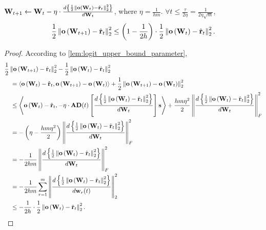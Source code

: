 \begin{lem}
		\label{lem:logit_l2_loss_parameter_smoothness}
		${\mathbf{W}}_{t+1} \leftarrow {\mathbf{W}}_t - \eta \cdot \frac{d \left\{ \frac{1}{2} \left\| {\mathbf{o}}\left( {\mathbf{W}}_t\right) - \hat{{\mathbf{r}}}_t \right\|_2^2 \right\}}{d {\mathbf{W}}_t}$, where $\eta = \frac{1}{h m}$. $\forall t \le \frac{\tau}{2 \eta} = \frac{1}{2 \eta \sqrt{m}}$,
		\begin{equation*}
		\begin{split}
		\frac{1}{2} \left\| {\mathbf{o}}\left( {\mathbf{W}}_{t+1} \right) - \hat{{\mathbf{r}}}_t \right\|_2^2 \le \left( 1 - \frac{1}{2 h} \right) \cdot \frac{1}{2} \left\| {\mathbf{o}}\left( {\mathbf{W}}_t \right) - \hat{{\mathbf{r}}}_t \right\|_2^2.
		\end{split}
		\end{equation*}
	\end{lem}
\begin{proof}
According to \cref{lem:logit_upper_bound_parameter},
\begin{equation*}
\begin{split}
    &\frac{1}{2} \left\| {\mathbf{o}}\left( {\mathbf{W}}_{t+1} \right) - \hat{{\mathbf{r}}}_t \right\|_2^2 - \frac{1}{2} \left\| {\mathbf{o}}\left( {\mathbf{W}}_t \right) - \hat{{\mathbf{r}}}_t \right\|_2^2 \\
    &\quad = \left\langle {\mathbf{o}}\left( {\mathbf{W}}_t \right) - \hat{{\mathbf{r}}}_t, {\mathbf{o}}\left( {\mathbf{W}}_{t+1} \right) - {\mathbf{o}}\left( {\mathbf{W}}_t \right) \right\rangle + \frac{1}{2} \left\| {\mathbf{o}}\left( {\mathbf{W}}_{t+1} \right) - {\mathbf{o}}\left( {\mathbf{W}}_t \right) \right\|_2^2 \\
    &\quad \le \left\langle {\mathbf{o}}\left( {\mathbf{W}}_t \right) - \hat{{\mathbf{r}}}_t, - \eta \cdot {\mathbf{A}} {\mathbf{D}}(t) \left[ \frac{d \left\{ \frac{1}{2} \left\| {\mathbf{o}}\left( {\mathbf{W}}_t\right) - \hat{{\mathbf{r}}}_t \right\|_2^2 \right\}}{d {\mathbf{W}}_t} \right] {\mathbf{s}} \right\rangle + \frac{h m \eta^2}{2} \left\| \frac{d \left\{ \frac{1}{2} \left\| {\mathbf{o}}\left( {\mathbf{W}}_t\right) - \hat{{\mathbf{r}}}_t \right\|_2^2 \right\}}{d {\mathbf{W}}_t}  \right\|_F^2 \\
    &\quad = - \left( \eta - \frac{h m \eta^2}{2} \right) \left\| \frac{d \left\{ \frac{1}{2} \left\| {\mathbf{o}}\left( {\mathbf{W}}_t\right) - \hat{{\mathbf{r}}}_t \right\|_2^2 \right\}}{d {\mathbf{W}}_t}  \right\|_F^2 \\
    &\quad = - \frac{1}{2 h m} \left\| \frac{d \left\{ \frac{1}{2} \left\| {\mathbf{o}}\left( {\mathbf{W}}_t\right) - \hat{{\mathbf{r}}}_t \right\|_2^2 \right\}}{d {\mathbf{W}}_t}  \right\|_F^2 \\
    &\quad = - \frac{1}{2 h m} \sum\limits_{r = 1}^{m}{ \left\| \frac{d \left\{ \frac{1}{2} \left\| {\mathbf{o}}\left( {\mathbf{W}}_t\right) - \hat{{\mathbf{r}}}_t \right\|_2^2 \right\}}{d {\mathbf{w}}_r(t)}  \right\|_2^2 } \\
    &\quad \le - \frac{1}{2 h} \cdot \frac{1}{2} \left\| {\mathbf{o}}\left( {\mathbf{W}}_t\right) - \hat{{\mathbf{r}}}_t \right\|_2^2. \qedhere
\end{split}
\end{equation*}
\end{proof}

